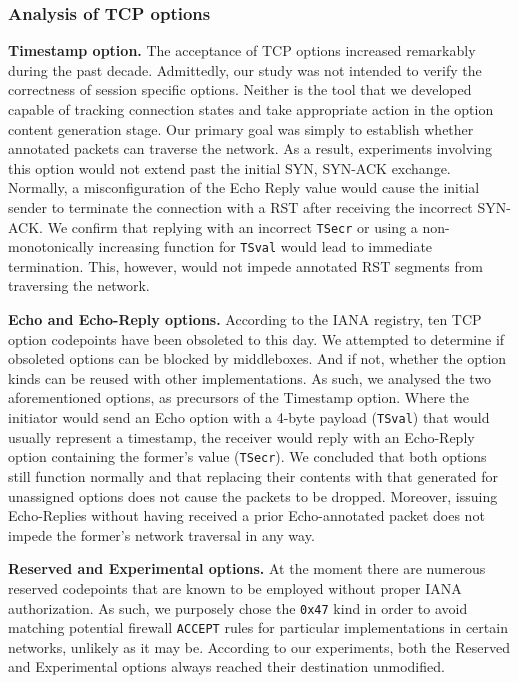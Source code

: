 \subsubsection{Analysis of TCP options}
\label{extend:ops:evaluation:rcp-ops}

\textbf{Timestamp option.} The acceptance of TCP options increased remarkably during the past decade. Admittedly, our study was not intended to verify the correctness of session specific options. Neither is the tool that we developed capable of tracking connection states and take appropriate action in the option content generation stage. Our primary goal was simply to establish whether annotated packets can traverse the network. As a result, experiments involving this option would not extend past the initial SYN, SYN-ACK exchange. Normally, a misconfiguration of the Echo Reply value would cause the initial sender to terminate the connection with a RST after receiving the incorrect SYN-ACK. We confirm that replying with an incorrect \texttt{TSecr} or using a non-monotonically increasing function for \texttt{TSval} would lead to immediate termination. This, however, would not impede annotated RST segments from traversing the network.

\textbf{Echo and Echo-Reply options.} According to the IANA registry, ten TCP option codepoints have been obsoleted to this day. We attempted to determine if obsoleted options can be blocked by middleboxes. And if not, whether the option kinds can be reused with other implementations. As such, we analysed the two aforementioned options, as precursors of the Timestamp option. Where the initiator would send an Echo option with a 4-byte payload (\texttt{TSval}) that would usually represent a timestamp, the receiver would reply with an Echo-Reply option containing the former's value (\texttt{TSecr}). We concluded that both options still function normally and that replacing their contents with that generated for unassigned options does not cause the packets to be dropped. Moreover, issuing Echo-Replies without having received a prior Echo-annotated packet does not impede the former's network traversal in any way.

\textbf{Reserved and Experimental options.} At the moment there are numerous reserved codepoints that are known to be employed without proper IANA authorization. As such, we purposely chose the \texttt{0x47} kind in order to avoid matching potential firewall \texttt{ACCEPT} rules for particular implementations in certain networks, unlikely as it may be. According to our experiments, both the Reserved and Experimental options always reached their destination unmodified.


